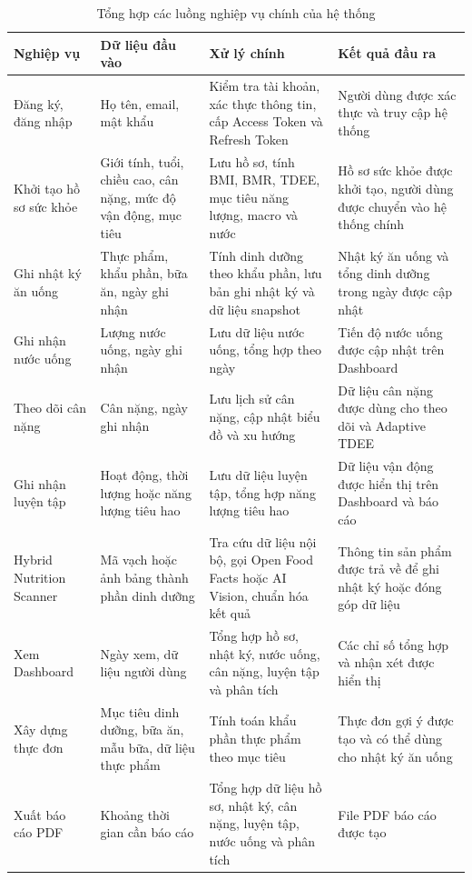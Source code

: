 \begin{table}[H]
\centering
\caption{Tổng hợp các luồng nghiệp vụ chính của hệ thống}
\begin{tabular}{|p{3cm}|p{4cm}|p{4cm}|p{4cm}|}
\hline
\textbf{Nghiệp vụ} & \textbf{Dữ liệu đầu vào} & \textbf{Xử lý chính} & \textbf{Kết quả đầu ra} \\ \hline
Đăng ký, đăng nhập & Họ tên, email, mật khẩu & Kiểm tra tài khoản, xác thực thông tin, cấp Access Token và Refresh Token & Người dùng được xác thực và truy cập hệ thống \\ \hline
Khởi tạo hồ sơ sức khỏe & Giới tính, tuổi, chiều cao, cân nặng, mức độ vận động, mục tiêu & Lưu hồ sơ, tính BMI, BMR, TDEE, mục tiêu năng lượng, macro và nước & Hồ sơ sức khỏe được khởi tạo, người dùng được chuyển vào hệ thống chính \\ \hline
Ghi nhật ký ăn uống & Thực phẩm, khẩu phần, bữa ăn, ngày ghi nhận & Tính dinh dưỡng theo khẩu phần, lưu bản ghi nhật ký và dữ liệu snapshot & Nhật ký ăn uống và tổng dinh dưỡng trong ngày được cập nhật \\ \hline
Ghi nhận nước uống & Lượng nước uống, ngày ghi nhận & Lưu dữ liệu nước uống, tổng hợp theo ngày & Tiến độ nước uống được cập nhật trên Dashboard \\ \hline
Theo dõi cân nặng & Cân nặng, ngày ghi nhận & Lưu lịch sử cân nặng, cập nhật biểu đồ và xu hướng & Dữ liệu cân nặng được dùng cho theo dõi và Adaptive TDEE \\ \hline
Ghi nhận luyện tập & Hoạt động, thời lượng hoặc năng lượng tiêu hao & Lưu dữ liệu luyện tập, tổng hợp năng lượng tiêu hao & Dữ liệu vận động được hiển thị trên Dashboard và báo cáo \\ \hline
Hybrid Nutrition Scanner & Mã vạch hoặc ảnh bảng thành phần dinh dưỡng & Tra cứu dữ liệu nội bộ, gọi Open Food Facts hoặc AI Vision, chuẩn hóa kết quả & Thông tin sản phẩm được trả về để ghi nhật ký hoặc đóng góp dữ liệu \\ \hline
Xem Dashboard & Ngày xem, dữ liệu người dùng & Tổng hợp hồ sơ, nhật ký, nước uống, cân nặng, luyện tập và phân tích & Các chỉ số tổng hợp và nhận xét được hiển thị \\ \hline
Xây dựng thực đơn & Mục tiêu dinh dưỡng, bữa ăn, mẫu bữa, dữ liệu thực phẩm & Tính toán khẩu phần thực phẩm theo mục tiêu & Thực đơn gợi ý được tạo và có thể dùng cho nhật ký ăn uống \\ \hline
Xuất báo cáo PDF & Khoảng thời gian cần báo cáo & Tổng hợp dữ liệu hồ sơ, nhật ký, cân nặng, luyện tập, nước uống và phân tích & File PDF báo cáo được tạo \\ \hline
\end{tabular}
\end{table}

